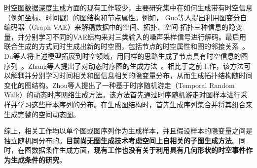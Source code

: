 \documentclass[12pt,UTF8,AutoFakeBold=2,a4paper]{ctexart} %
\begin{document}
\underline{时空图数据深度生成}方面的现有工作较少，主要研究集中在如何生成带有时空信息（例如坐标、时间戳）的图结构和节点属性。例如，
Guo等人提出利用图变分自编码器（Graph VAE）来解耦数据中的空间、拓扑、空间-拓扑三种信息的隐变量，并分别学习不同的VAE结构来对三类输入的噪声采样信号进行解码。最后用联合生成的方式同时生成出新的时空图，包括节点的时空属性和图的邻接关系~\cite{du2022disentangled}。Du等人将上述模型拓展到时空领域，用同样的思路生成了节点具有时空信息的图序列~\cite{du2022disentangled}。Zhang等人提出了对动态时序图的生成方法~\cite{zhang2021disentangled}。相比于之前工作，该方法可以解耦并分别学习时间相关和图信息相关的隐变量分布，从而生成拓扑结构随时间变化的图结构。Zhou等人提出了一种基于时序随机游走（Temporal Random Walk）的动态时序网络生成方法。该方法首先通过时序随机游走对图样本进行采样并学习这些样本序列的分布。在生成图结构时，首先生成序列集合并将其组合来生成完整的空间动态图。

综上，相关工作均以单个图或图序列作为生成样本，并且假设样本的隐变量之间是独立随机同分布的。\textbf{目前尚无图生成技术考虑空间上自相关的子图生成方法}。同时，在图数据条件生成方面，\textbf{现有工作也没有关于利用具有几何形状的时空事件作为生成条件的研究}。

\end{document}
